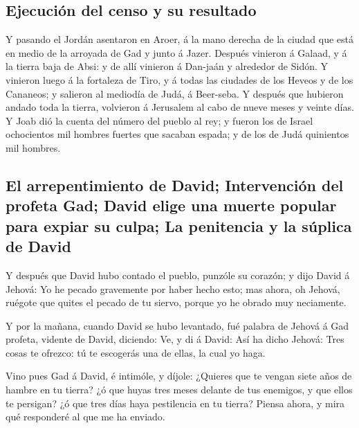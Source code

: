 \hypertarget{ejecuciuxf3n-del-censo-y-su-resultado}{%
\subsection{Ejecución del censo y su
resultado}\label{ejecuciuxf3n-del-censo-y-su-resultado}}

 Y pasando el Jordán asentaron en Aroer, á la mano derecha
de la ciudad que está en medio de la arroyada de Gad y junto á Jazer.
 Después vinieron á Galaad, y á la tierra baja de Absi: y
de allí vinieron á Dan-jaán y alrededor de Sidón.  Y
vinieron luego á la fortaleza de Tiro, y á todas las ciudades de los
Heveos y de los Cananeos; y salieron al mediodía de Judá, á Beer-seba.
 Y después que hubieron andado toda la tierra, volvieron á
Jerusalem al cabo de nueve meses y veinte días.  Y Joab
dió la cuenta del número del pueblo al rey; y fueron los de Israel
ochocientos mil hombres fuertes que sacaban espada; y de los de Judá
quinientos mil hombres.

\hypertarget{el-arrepentimiento-de-david-intervenciuxf3n-del-profeta-gad-david-elige-una-muerte-popular-para-expiar-su-culpa-la-penitencia-y-la-suxfaplica-de-david}{%
\subsection{El arrepentimiento de David; Intervención del profeta Gad;
David elige una muerte popular para expiar su culpa; La penitencia y la
súplica de
David}\label{el-arrepentimiento-de-david-intervenciuxf3n-del-profeta-gad-david-elige-una-muerte-popular-para-expiar-su-culpa-la-penitencia-y-la-suxfaplica-de-david}}

 Y después que David hubo contado el pueblo, punzóle su
corazón; y dijo David á Jehová: Yo he pecado gravemente por haber hecho
esto; mas ahora, oh Jehová, ruégote que quites el pecado de tu siervo,
porque yo he obrado muy neciamente.

 Y por la mañana, cuando David se hubo levantado, fué
palabra de Jehová á Gad profeta, vidente de David, diciendo:
 Ve, y di á David: Así ha dicho Jehová: Tres cosas te
ofrezco: tú te escogerás una de ellas, la cual yo haga.

 Vino pues Gad á David, é intimóle, y díjole: ¿Quieres
que te vengan siete años de hambre en tu tierra? ¿ó que huyas tres meses
delante de tus enemigos, y que ellos te persigan? ¿ó que tres días haya
pestilencia en tu tierra? Piensa ahora, y mira qué responderé al que me
ha enviado.

